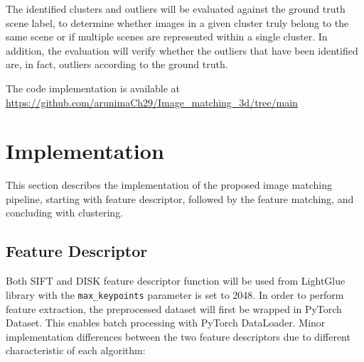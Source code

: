 \documentclass[report.tex]{subfiles}
\begin{document}
    The identified clusters and outliers will be evaluated against the ground truth scene label, to determine whether images in a given cluster truly belong to the same scene or if multiple scenes are represented within a single cluster. In addition, the evaluation will verify whether the outliers that have been identified are, in fact, outliers according to the ground truth.

    The code implementation is available at \url{https://github.com/arunimaCh29/Image_matching_3d/tree/main}

    \section{Implementation}
    This section describes the implementation of the proposed image matching pipeline, starting with feature descriptor, followed by the feature matching, and concluding with clustering.
    
    \subsection{Feature Descriptor}
    Both SIFT and DISK feature descriptor function will be used from LightGlue library with the \texttt{max\_keypoints} parameter is set to 2048. In order to perform feature extraction, the preprocessed dataset will first be wrapped in PyTorch Dataset. This enables batch processing with PyTorch DataLoader. Minor implementation differences between the two feature descriptors due to different characteristic of each algorithm:
\end{document}
